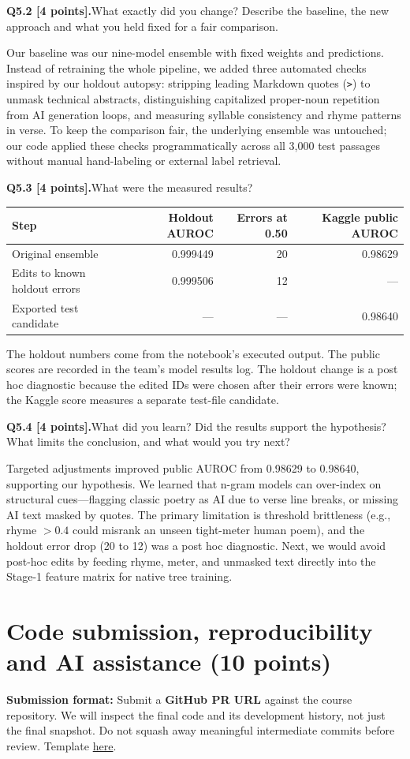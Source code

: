 \documentclass[11pt,letterpaper]{article}
\newcommand{\question}[2]{\needspace{4\baselineskip}\par\addvspace{0.45em}\noindent\textbf{#1}\quad #2\par\nobreak\vspace{0.1em}}
\begin{document}
\question{Q5.2 [4 points].}{What exactly did you change? Describe the baseline, the new approach and what you held fixed for a fair comparison.}
Our baseline was our nine-model ensemble with fixed weights and predictions. Instead of retraining the whole pipeline, we added three automated checks inspired by our holdout autopsy: stripping leading Markdown quotes (\texttt{>}) to unmask technical abstracts, distinguishing capitalized proper-noun repetition from AI generation loops, and measuring syllable consistency and rhyme patterns in verse. To keep the comparison fair, the underlying ensemble was untouched; our code applied these checks programmatically across all 3,000 test passages without manual hand-labeling or external label retrieval.

\question{Q5.3 [4 points].}{What were the measured results?}
\begin{tabularx}{\linewidth}{@{}Yrrr@{}}\toprule
Step & Holdout AUROC & Errors at 0.50 & Kaggle public AUROC \\ \midrule
Original ensemble & 0.999449 & 20 & 0.98629 \\
Edits to known holdout errors & 0.999506 & 12 & --- \\
Exported test candidate & --- & --- & 0.98640 \\
\bottomrule\end{tabularx}

The holdout numbers come from the notebook's executed output. The public scores are recorded in the team's model results log. The holdout change is a post hoc diagnostic because the edited IDs were chosen after their errors were known; the Kaggle score measures a separate test-file candidate.

\question{Q5.4 [4 points].}{What did you learn? Did the results support the hypothesis? What limits the conclusion, and what would you try next?}
Targeted adjustments improved public AUROC from 0.98629 to 0.98640, supporting our hypothesis. We learned that n-gram models can over-index on structural cues---flagging classic poetry as AI due to verse line breaks, or missing AI text masked by quotes. The primary limitation is threshold brittleness (e.g., rhyme $> 0.4$ could misrank an unseen tight-meter human poem), and the holdout error drop (20 to 12) was a post hoc diagnostic. Next, we would avoid post-hoc edits by feeding rhyme, meter, and unmasked text directly into the Stage-1 feature matrix for native tree training.

\newpage
\enlargethispage{5\baselineskip}
\section{Code submission, reproducibility and AI assistance (10 points)}
\textbf{Submission format:} Submit a \textbf{GitHub PR URL} against the course repository. We will inspect the final code and its development history, not just the final snapshot. Do not squash away meaningful intermediate commits before review. Template \href{https://github.com/sekhari/human-or-ai-submissions}{here}.
\end{document}
